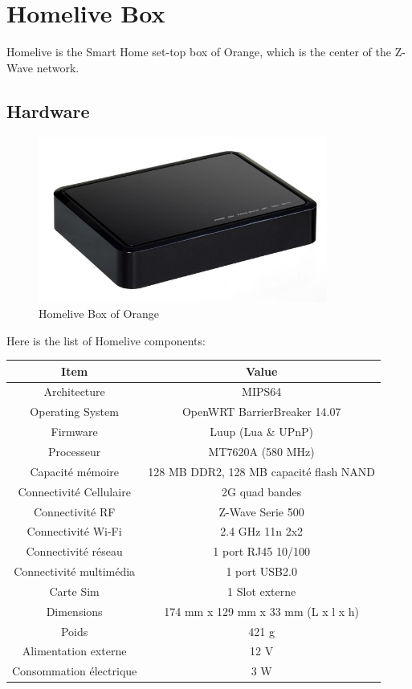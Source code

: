 \section{Homelive Box}
Homelive is the Smart Home set-top box of Orange, which is the center of the Z-Wave network.

\subsection{Hardware}

\begin{figure}[htbp]
	\centering
		\includegraphics[width=9.5cm]{Figures/Orange-Home-Live.jpg}
	\caption[Homelive Box of Orange]{Homelive Box of Orange}
	\label{fig:homelivebox}
\end{figure}

Here is the list of Homelive components:

\begin{center}
  \begin{tabular}{@{} cc @{}}
    \toprule
    Item & Value \\*
    \midrule
    Architecture & MIPS64 \\
    Operating System & OpenWRT BarrierBreaker 14.07\\
    Firmware & Luup (Lua \& UPnP) \\
		Processeur & MT7620A (580 MHz) \\
		Capacité mémoire & 128 MB DDR2, 128 MB capacité flash NAND \\
		Connectivité Cellulaire & 2G quad bandes \\
		Connectivité RF & Z-Wave Serie 500 \\
		Connectivité Wi-Fi & 2.4 GHz 11n 2x2 \\
		Connectivité réseau & 1 port RJ45 10/100 \\
		Connectivité multimédia & 1 port USB2.0 \\
		Carte Sim & 1 Slot externe \\
		Dimensions & 174 mm x 129 mm x 33 mm (L x l x h) \\
		Poids & 421 g \\
		Alimentation externe & 12 V \\
		Consommation électrique & 3 W \\
    \bottomrule
  \end{tabular}
\end{center}

